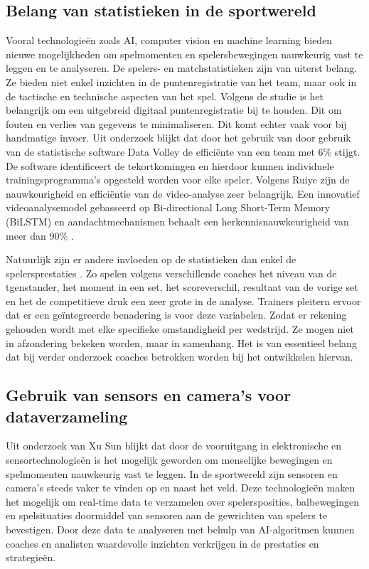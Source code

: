 \subsection{Belang van statistieken in de sportwereld}
Vooral technologieën zoals AI, computer vision en machine learning bieden nieuwe 
mogelijkheden om spelmomenten en spelersbewegingen nauwkeurig vast te leggen en te analyseren. De spelers-
en matchstatistieken \autocite{Wahyuti2023} zijn van uiterst belang. Ze bieden niet enkel inzichten in de
puntenregistratie van het team, maar ook in de tactische en technische aspecten van het spel. Volgens de 
studie is het belangrijk om een uitgebreid digitaal puntenregistratie bij te houden. Dit om fouten en
verlies van gegevens te minimaliseren. Dit komt echter vaak voor bij handmatige invoer.
Uit onderzoek \autocite{Harabagiu2023} blijkt dat door het gebruik van door gebruik van de statistische 
software Data Volley de efficiënte van een team met 6\% stijgt. De software identificeert de tekortkomingen 
en hierdoor kunnen individuele trainingsprogramma's opgesteld worden voor elke speler.
Volgens Ruiye \textcite{Ruiye2024} zijn de nauwkeurigheid en efficiëntie van de video-analyse zeer 
belangrijk. Een innovatief videoanalysemodel gebasseerd op Bi-directional Long Short-Term Memory (BiLSTM) 
en aandachtmechanismen behaalt een herkennisnauwkeurigheid van meer dan 90\% .

Natuurlijk zijn er andere invloeden op de statistieken dan enkel de spelersprestaties 
\autocite{LopezSerrano2022}. Zo spelen volgens verschillende coaches het niveau van de tgenstander,
het moment in een set, het scoreverschil, resultaat van de vorige set en het de competitieve druk 
een zeer grote in de analyse. Trainers pleitern ervoor dat er een geïntegreerde benadering is voor deze 
variabelen. Zodat er rekening gehouden wordt met elke specifieke omstandigheid per wedstrijd. Ze mogen 
niet in afzondering bekeken worden, maar in samenhang. Het is van essentieel belang dat bij verder onderzoek
coaches betrokken worden bij het ontwikkelen hiervan.


\subsection{Gebruik van sensors en camera's voor dataverzameling}
Uit onderzoek van Xu Sun \textcite{Sun2021} blijkt dat door de vooruitgang in elektronische en 
sensortechnologieën is het mogelijk geworden om menselijke bewegingen en spelmomenten nauwkeurig vast te 
leggen. In de sportwereld zijn sensoren en camera's steeds vaker te vinden op en naast het veld. Deze 
technologieën maken het mogelijk om real-time data te verzamelen over spelersposities, balbewegingen en 
spelsituaties doormiddel van sensoren aan de gewrichten van spelers te bevestigen. Door deze data te 
analyseren met behulp van AI-algoritmen kunnen coaches en analisten waardevolle inzichten verkrijgen in 
de prestaties en strategieën.

